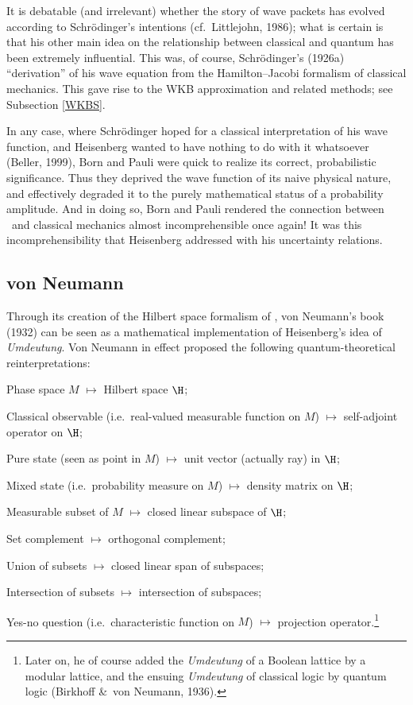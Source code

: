 \documentclass[12pt,titlepage]{article}
\begin{document}
It is debatable (and irrelevant) whether the story of wave packets has evolved 
 according to Schr\"{o}dinger's intentions (cf.\ Littlejohn, 1986); what is certain is that his other main idea on the relationship between classical and quantum has been extremely influential. This was, of course,  Schr\"{o}dinger's (1926a) ``derivation'' of his wave equation from the Hamilton--Jacobi formalism of classical mechanics. This  gave rise to the WKB approximation and related methods; see Subsection \ref{WKBS}. 

In any case, where Schr\"{o}dinger hoped for a classical interpretation of his wave function, and Heisenberg wanted to have nothing to do with it whatsoever (Beller, 1999), 
Born and Pauli were quick to realize its correct, probabilistic significance.
Thus they deprived the wave function of its naive physical nature, and effectively 
 degraded it to the purely mathematical status of a probability amplitude.
And in doing so, Born and Pauli rendered the connection between \qm\ and classical mechanics almost incomprehensible once again! It was this incomprehensibility that Heisenberg addressed with his uncertainty relations.  
 \subsection{von Neumann}\label{vNs}
Through its creation of the Hilbert space formalism of \qm,  von Neumann's book  (1932) can be seen as a mathematical implementation of Heisenberg's idea of {\it Umdeutung}. Von Neumann in effect proposed the following quantum-theoretical reinterpretations:
\begin{trivlist}
\item Phase space $M$ $\mathbf{\mapsto}$ Hilbert space $\H$;
\item  Classical observable (i.e.\ real-valued measurable function on $M$)  $\mathbf{\mapsto}$ self-adjoint operator on $\H$;
\item Pure state (seen as point in $M$)  $\mathbf{\mapsto}$ unit vector (actually ray)  in $\H$;
\item Mixed state (i.e.\ probability measure on $M$) $\mathbf{\mapsto}$  density matrix on $\H$;
\item Measurable subset of $M$  $\mathbf{\mapsto}$ closed linear subspace  of $\H$;
\item Set complement  $\mathbf{\mapsto}$ orthogonal complement;
\item Union of subsets  $\mathbf{\mapsto}$ closed linear span of subspaces;
\item Intersection of subsets $\mathbf{\mapsto}$ intersection of subspaces;
\item Yes-no question (i.e.\ characteristic function on $M$) $\mathbf{\mapsto}$ projection operator.\footnote{Later on, he of course added the {\it Umdeutung} of a Boolean lattice by a modular lattice, and  the ensuing {\it Umdeutung} of classical logic by quantum logic (Birkhoff \&\ von Neumann,  1936). }
 \end{trivlist}
\end{document}
